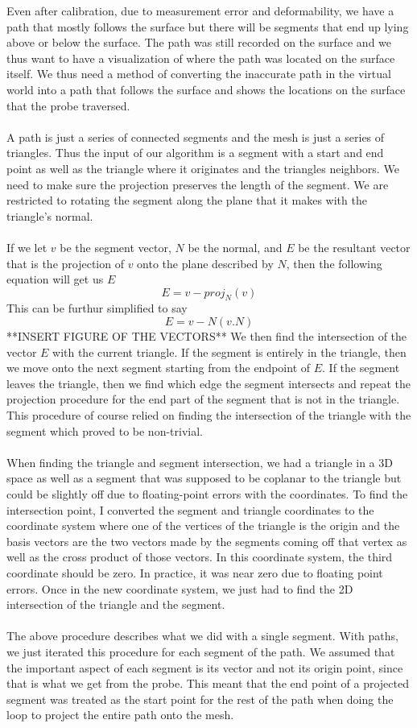 \documentclass[conference]{acmsiggraph}
\begin{document}
Even after calibration, due to measurement error and deformability, we have a path that mostly follows the surface but there will be segments that end up lying above or below the surface. The path was still recorded on the surface and we thus want to have a visualization of where the path was located on the surface itself. We thus need a method of converting the inaccurate path in the virtual world into a path that follows the surface and shows the locations on the surface that the probe traversed. \\
\\
A path is just a series of connected segments and the mesh is just a series of triangles. Thus the input of our algorithm is a segment with a start and end point as well as the triangle where it originates and the triangles neighbors. We need to make sure the projection preserves the length of the segment. We are restricted to rotating the segment along the plane that it makes with the triangle's normal. \\
\\
If we let $v$ be the segment vector, $N$ be the normal, and $E$ be the resultant vector that is the projection of $v$ onto the plane described by $N$, then the following equation will get us $E$
\[
E = v - proj_N(v)
\]
This can be furthur simplified to say
\[
E = v - N(v.N)
\]
**INSERT FIGURE OF THE VECTORS**
We then find the intersection of the vector $E$ with the current triangle. If the segment is entirely in the triangle, then we move onto the next segment starting from the endpoint of $E$. If the segment leaves the triangle, then we find which edge the segment intersects and repeat the projection procedure for the end part of the segment that is not in the triangle. This procedure of course relied on finding the intersection of the triangle with the segment which proved to be non-trivial.\\
\\
When finding the triangle and segment intersection, we had a triangle in a 3D space as well as a segment that was supposed to be coplanar to the triangle but could be slightly off due to floating-point errors with the coordinates. To find the intersection point, I converted the segment and triangle coordinates to the coordinate system where one of the vertices of the triangle is the origin and the basis vectors are the two vectors made by the segments coming off that vertex as well as the cross product of those vectors. In this coordinate system, the third coordinate should be zero. In practice, it was near zero due to floating point errors. Once in the new coordinate system, we just had to find the 2D intersection of the triangle and the segment. \\
\\
The above procedure describes what we did with a single segment. With paths, we just iterated this procedure for each segment of the path. We assumed that the important aspect of each segment is its vector and not its origin point, since that is what we get from the probe. This meant that the end point of a projected segment was treated as the start point for the rest of the path when doing the loop to project the entire path onto the mesh.
\end{document}
